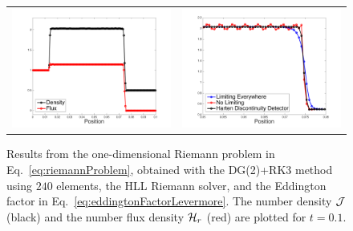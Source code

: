 \documentclass[10pt,preprint]{aastex}
\begin{document}
\begin{figure}
  \begin{center}
    \begin{tabular}{cc}
      \includegraphics[scale=0.4]{./Figures/RiemannProblem1D} &
      \includegraphics[scale=0.4]{./Figures/RiemannProblem1D_Limiters}
    \end{tabular}
  \end{center}
  \caption{Results from the one-dimensional Riemann problem in Eq.~\eqref{eq:riemannProblem}, obtained with the DG(2)+RK3 method using $240$ elements, the HLL Riemann solver, and the Eddington factor in Eq.~\eqref{eq:eddingtonFactorLevermore}.  
  The number density $\mathcal{J}$ (black) and the number flux density $\mathcal{H}_{r}$ (red) are plotted for $t=0.1$.}
  \label{fig:riemannProblem}
\end{figure}
\end{document}
